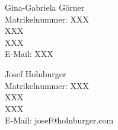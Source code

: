 \begin{titlepage}
\begin{minipage}[t]{0.48\textwidth}
    \flushleft 
    Gina-Gabriela Görner \\
    Matrikelnummer: XXX \\
    XXX \vspace{0.1cm} \\ 
	XXX \vspace{0.1cm}  \\
	E-Mail: XXX \\ 
\end{minipage}
\begin{minipage}[t]{0.48\textwidth}
	\flushleft
	Josef Holnburger \\
	Matrikelnummer: XXX \\
	XXX \vspace{0.1cm} \\
	XXX \vspace{0.1cm} \\
	E-Mail: josef@holnburger.com \\
\end{minipage}


\end{titlepage}

